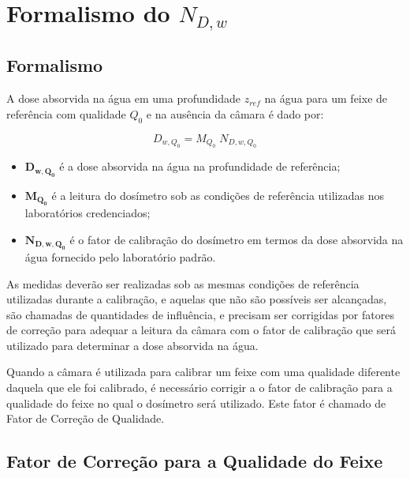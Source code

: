 \documentclass[11pt,a4paper]{article}
\newcounter{exemplo}
\begin{document}
	\section{Formalismo do $N_{D,w}$}

	\subsection{Formalismo}

	A dose absorvida na água em uma profundidade $z_{ref}$ na água para um feixe de referência com qualidade $Q_0$ e na ausência da câmara é dado por:

  		\begin{equation}
			D_{w,Q_0} = M_{Q_0} \; N_{D,w,Q_{0}}
		\end{equation}
  		

  		\begin{exemplo}[onde:]
			\begin{itemize}[label=\textcolor{CarnationPink}{$\star$}]
				\item \textbf{\textcolor{CarnationPink}{$\mathbf{D_{w,Q_0}}$}} é a dose absorvida na água na profundidade de referência;
				\item \textbf{\textcolor{CarnationPink}{$\mathbf{M_{Q_0}}$}} é a leitura do dosímetro sob as condições de referência utilizadas nos laboratórios credenciados;
				\item \textbf{\textcolor{CarnationPink}{$\mathbf{N_{D,w,Q_{0}}}$}} é o fator de calibração  do dosímetro em termos da dose absorvida na água fornecido pelo laboratório padrão.
			\end{itemize}
		\end{exemplo}

	As medidas deverão ser realizadas sob as mesmas condições de referência utilizadas durante a calibração, e aquelas que não são possíveis ser alcançadas, são chamadas de quantidades de influência, e precisam ser corrigidas por fatores de correção para adequar a leitura da câmara com o fator de calibração que será utilizado para determinar a dose absorvida na água.

	Quando a câmara é utilizada para calibrar um feixe com uma qualidade diferente daquela que ele foi calibrado, é necessário corrigir a o fator de calibração para a qualidade do feixe no qual o dosímetro será utilizado. Este fator é chamado de Fator de Correção de Qualidade.

	\subsection{Fator de Correção para a Qualidade do Feixe}
\end{document}
